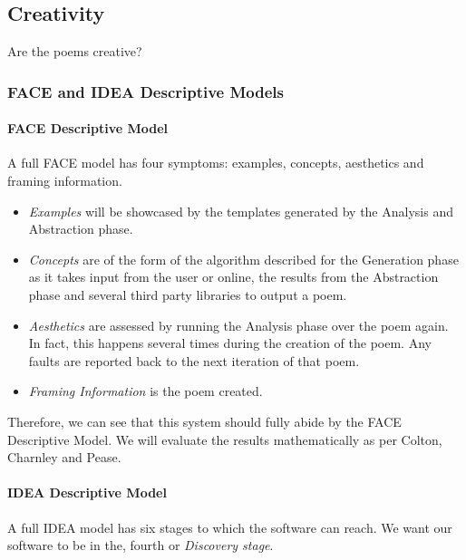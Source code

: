 \subsection{Creativity}
Are the poems creative?
\subsubsection{FACE and IDEA Descriptive Models}
\paragraph{FACE Descriptive Model}
\label{sec:face}
A full FACE model has four symptoms: examples, concepts, aesthetics and framing information.

\begin{itemize}
\setlength{\itemsep}{0pt}
\item{\emph{Examples} will be showcased by the templates generated by the Analysis and Abstraction phase.}
\item{\emph{Concepts} are of the form of the algorithm described for the Generation phase as it takes input from the user or online, the results from the Abstraction phase and several third party libraries to output a poem.}
\item{\emph{Aesthetics} are assessed by running the Analysis phase over the poem again. In fact, this happens several times during the creation of the poem. Any faults are reported back to the next iteration of that poem.}
\item{\emph{Framing Information} is the poem created.}
\end{itemize}

Therefore, we can see that this system should fully abide by the FACE Descriptive Model. We will evaluate the results mathematically as per Colton, Charnley and Pease.

\paragraph{IDEA Descriptive Model}
\label{sec:idea}
A full IDEA model has six stages to which the software can reach. We want our software to be in the, fourth or \emph{Discovery stage}.

